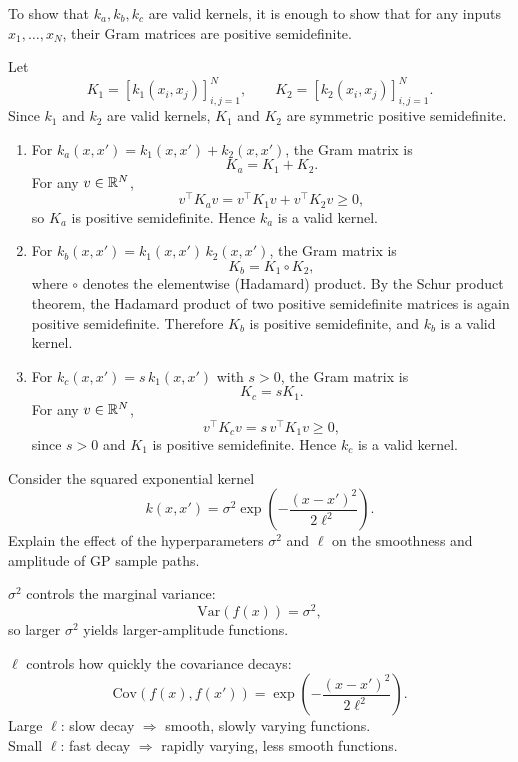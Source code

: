 \begin{solution}
To show that \(k_a,k_b,k_c\) are valid kernels, it is enough to show that for any inputs \(x_1,\ldots,x_N\), their Gram matrices are positive semidefinite.

Let
\[
K_1 = [k_1(x_i,x_j)]_{i,j=1}^N,
\qquad
K_2 = [k_2(x_i,x_j)]_{i,j=1}^N.
\]
Since \(k_1\) and \(k_2\) are valid kernels, \(K_1\) and \(K_2\) are symmetric positive semidefinite.

\begin{enumerate}
    \item For \(k_a(x,x') = k_1(x,x') + k_2(x,x')\), the Gram matrix is
    \[
    K_a = K_1 + K_2.
    \]
    For any \(v\in{\mathbb R}^N\),
    \[
    v^\top K_a v = v^\top K_1 v + v^\top K_2 v \geq 0,
    \]
    so \(K_a\) is positive semidefinite. Hence \(k_a\) is a valid kernel.

    \item For \(k_b(x,x') = k_1(x,x')\,k_2(x,x')\), the Gram matrix is
    \[
    K_b = K_1 \circ K_2,
    \]
    where \(\circ\) denotes the elementwise (Hadamard) product. By the Schur product theorem, the Hadamard product of two positive semidefinite matrices is again positive semidefinite. Therefore \(K_b\) is positive semidefinite, and \(k_b\) is a valid kernel.

    \item For \(k_c(x,x') = s\,k_1(x,x')\) with \(s>0\), the Gram matrix is
    \[
    K_c = s K_1.
    \]
    For any \(v\in{\mathbb R}^N\),
    \[
    v^\top K_c v = s\, v^\top K_1 v \geq 0,
    \]
    since \(s>0\) and \(K_1\) is positive semidefinite. Hence \(k_c\) is a valid kernel.
\end{enumerate}

\end{solution}

\begin{exercise}
    Consider the squared exponential kernel
    \[
    k(x,x') = \sigma^2 \exp\left(-\frac{(x-x')^2}{2\ell^2}\right).
    \]
    Explain the effect of the hyperparameters \(\sigma^2\) and \(\ell\) on the smoothness and amplitude of GP sample paths.
\end{exercise}

\begin{solution}
\(\sigma^2\) controls the marginal variance:
\[
\mathrm{Var}(f(x)) = \sigma^2,
\]
so larger \(\sigma^2\) yields larger-amplitude functions.

\(\ell\) controls how quickly the covariance decays:
\[
\mathrm{Cov}(f(x),f(x')) = \exp\!\left(-\frac{(x-x')^2}{2\ell^2}\right).
\]
Large \(\ell\): slow decay \(\Rightarrow\) smooth, slowly varying functions.  \\
Small \(\ell\): fast decay \(\Rightarrow\) rapidly varying, less smooth functions.
\end{solution}

